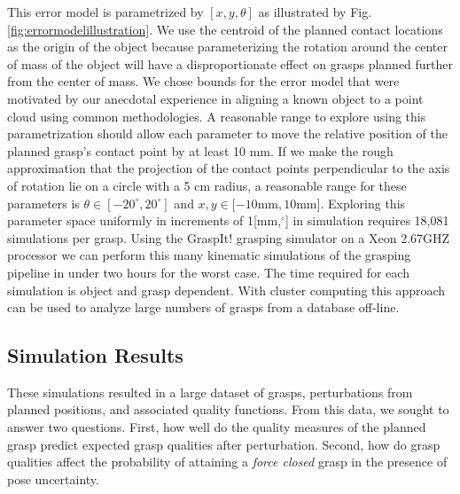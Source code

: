 This error model is parametrized by $[x,y, \theta]$ as illustrated by Fig. \ref{fig:errormodelillustration}.  We use the centroid of the planned contact locations as the  origin of the object because parameterizing the rotation around the center of mass of the object will have a disproportionate effect on grasps planned further from the center of mass.  We chose bounds for the error model that were motivated by our anecdotal experience in aligning a known object to a point cloud using common methodologies. A reasonable range to explore using this parametrization should allow each parameter to move the relative position of the planned grasp's contact point by at least 10 mm.  If we make the rough approximation that the projection of the contact points perpendicular to the axis of rotation lie on a circle with a 5 cm radius, a reasonable range for these parameters is $\theta \in [-20^{\circ},20^{\circ}]$  and $x,y \in [-10 $mm$ ,10 $mm$]$.   Exploring this parameter space uniformly in increments of 1[mm,$^\circ$] in simulation requires 18,081 simulations per grasp. Using the GraspIt! grasping simulator\cite{Miller2004} on a Xeon 2.67GHZ processor we can perform this many kinematic simulations of the grasping pipeline in under two hours  for the worst case.  The time required for each simulation is object and grasp dependent. With cluster computing this approach can be used to analyze large numbers of grasps from a database off-line.\par

\subsection{Simulation Results}
These simulations resulted in a large dataset of grasps, perturbations from planned positions, and associated quality functions. From this data, we sought to answer two questions. First, how well do the quality measures of the planned grasp predict expected grasp qualities after perturbation. Second, how do grasp qualities affect the probability of attaining a \emph{force closed} grasp in the presence of pose uncertainty.  
